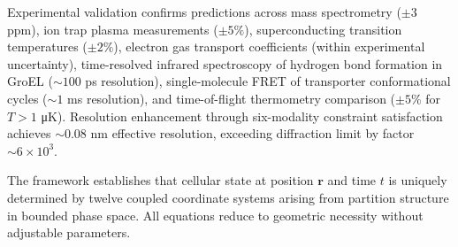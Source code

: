 \documentclass[12pt,a4paper]{article}
\theoremstyle{plain}
\theoremstyle{definition}
\theoremstyle{remark}
\begin{document}
Experimental validation confirms predictions across mass spectrometry ($\pm 3$ ppm), ion trap plasma measurements ($\pm 5\%$), superconducting transition temperatures ($\pm 2\%$), electron gas transport coefficients (within experimental uncertainty), time-resolved infrared spectroscopy of hydrogen bond formation in GroEL ($\sim 100$ ps resolution), single-molecule FRET of transporter conformational cycles ($\sim 1$ ms resolution), and time-of-flight thermometry comparison ($\pm 5\%$ for $T > 1$ μK). Resolution enhancement through six-modality constraint satisfaction achieves $\sim 0.08$ nm effective resolution, exceeding diffraction limit by factor $\sim 6 \times 10^3$.

The framework establishes that cellular state at position $\mathbf{r}$ and time $t$ is uniquely determined by twelve coupled coordinate systems arising from partition structure in bounded phase space. All equations reduce to geometric necessity without adjustable parameters.



\end{document}
